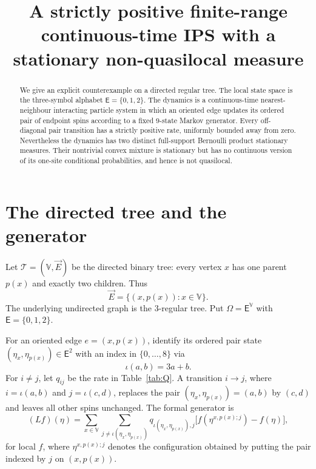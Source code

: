 \documentclass[11pt]{article}
\title{A strictly positive finite-range continuous-time IPS with a stationary non-quasilocal measure}
\author{}
\date{}
\newcommand{\EE}{\mathsf E}
\newcommand{\V}{\mathbb V}
\begin{document}
\maketitle

\begin{abstract}
We give an explicit counterexample on a directed regular tree.  The local state
space is the three-symbol alphabet $\EE=\{0,1,2\}$.  The dynamics is a
continuous-time nearest-neighbour interacting particle system in which an
oriented edge updates its ordered pair of endpoint spins according to a fixed
$9$-state Markov generator.  Every off-diagonal pair transition has a strictly
positive rate, uniformly bounded away from zero.  Nevertheless the dynamics
has two distinct full-support Bernoulli product stationary measures.  Their
nontrivial convex mixture is stationary but has no continuous version of its
one-site conditional probabilities, and hence is not quasilocal.
\end{abstract}

\section{The directed tree and the generator}

Let $\mathcal T=(\V,\vec E)$ be the directed binary tree: every vertex $x$ has
one parent $p(x)$ and exactly two children.  Thus
\[
  \vec E=\{(x,p(x)):x\in\V\}.
\]
The underlying undirected graph is the $3$-regular tree.  Put
$\Omega=\EE^{\V}$ with $\EE=\{0,1,2\}$.

For an oriented edge $e=(x,p(x))$, identify its ordered pair state
$(\eta_x,\eta_{p(x)})\in\EE^2$ with an index in $\{0,\dots,8\}$ via
\[
  \iota(a,b)=3a+b.
\]
For $i\ne j$, let $q_{ij}$ be the rate in Table~\ref{tab:Q}.  A transition
$i\to j$, where $i=\iota(a,b)$ and $j=\iota(c,d)$, replaces the pair
$(\eta_x,\eta_{p(x)})=(a,b)$ by $(c,d)$ and leaves all other spins unchanged.
The formal generator is
\begin{equation}
  (Lf)(\eta)
  =\sum_{x\in\V}\sum_{j\ne \iota(\eta_x,\eta_{p(x)})}
  q_{\iota(\eta_x,\eta_{p(x)}),j}
  \bigl[f(\eta^{x,p(x);j})-f(\eta)\bigr],
  \label{eq:generator}
\end{equation}
for local $f$, where $\eta^{x,p(x);j}$ denotes the configuration obtained by
putting the pair indexed by $j$ on $(x,p(x))$.
\end{document}
